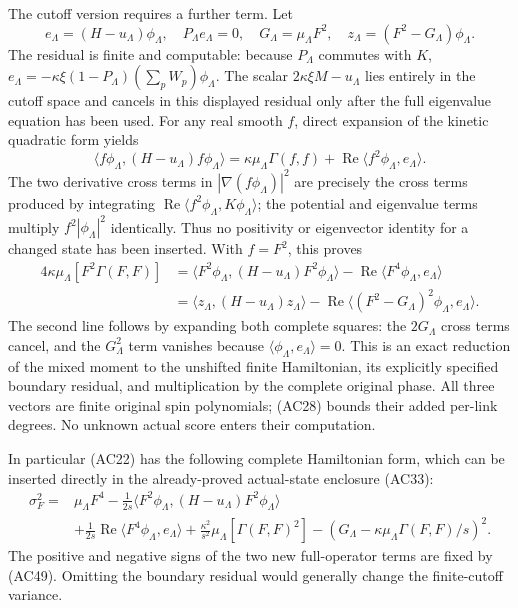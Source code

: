 \documentclass[11pt]{article}
\begin{document}
The cutoff version requires a further term. Let
\[
 e_\Lambda=(H-u_\Lambda)\phi_\Lambda,\quad
 P_\Lambda e_\Lambda=0,\quad
 G_\Lambda=\mu_\Lambda F^2,\quad
 z_\Lambda=(F^2-G_\Lambda)\phi_\Lambda .
 \tag{AC48}
\]
The residual is finite and computable: because \(P_\Lambda\) commutes with \(K\),
\(e_\Lambda=-\kappa\xi(1-P_\Lambda)(\sum_pW_p)\phi_\Lambda\).
The scalar \(2\kappa\xi M-u_\Lambda\) lies entirely in the cutoff space and cancels in this displayed residual only after the full eigenvalue equation has been used. For any real smooth \(f\), direct expansion of the kinetic quadratic form yields
\[
 \langle f\phi_\Lambda,(H-u_\Lambda)f\phi_\Lambda\rangle
 =\kappa\mu_\Lambda\Gamma(f,f)
       +\operatorname{Re}\langle f^2\phi_\Lambda,e_\Lambda\rangle .
\]
The two derivative cross terms in \(|\nabla(f\phi_\Lambda)|^2\) are precisely the cross terms produced by integrating
\(\operatorname{Re}\langle f^2\phi_\Lambda,K\phi_\Lambda\rangle\);
the potential and eigenvalue terms multiply \(f^2|\phi_\Lambda|^2\) identically. Thus no positivity or eigenvector identity for a changed state has been inserted. With \(f=F^2\), this proves
\[
 \begin{aligned}
 4\kappa\mu_\Lambda[F^2\Gamma(F,F)]
 &=\langle F^2\phi_\Lambda,(H-u_\Lambda)F^2\phi_\Lambda\rangle
       -\operatorname{Re}\langle F^4\phi_\Lambda,e_\Lambda\rangle\\
 &=\langle z_\Lambda,(H-u_\Lambda)z_\Lambda\rangle
       -\operatorname{Re}
          \langle(F^2-G_\Lambda)^2\phi_\Lambda,e_\Lambda\rangle .
 \end{aligned}\tag{AC49}
\]
The second line follows by expanding both complete squares: the \(2G_\Lambda\) cross terms cancel, and the \(G_\Lambda^2\) term vanishes because \(\langle\phi_\Lambda,e_\Lambda\rangle=0\). This is an exact reduction of the mixed moment to the unshifted finite Hamiltonian, its explicitly specified boundary residual, and multiplication by the complete original phase. All three vectors are finite original spin polynomials; (AC28) bounds their added per-link degrees. No unknown actual score enters their computation.

In particular (AC22) has the following complete Hamiltonian form, which can be inserted directly in the already-proved actual-state enclosure (AC33):
\[
 \begin{aligned}
 \sigma_F^2={}&\mu_\Lambda F^4
 -\frac1{2s}
     \langle F^2\phi_\Lambda,(H-u_\Lambda)F^2\phi_\Lambda\rangle\\
 &+\frac1{2s}\operatorname{Re}
                  \langle F^4\phi_\Lambda,e_\Lambda\rangle
 +\frac{\kappa^2}{s^2}\mu_\Lambda[\Gamma(F,F)^2]
 -(G_\Lambda-\kappa\mu_\Lambda\Gamma(F,F)/s)^2 .
 \end{aligned}\tag{AC50}
\]
The positive and negative signs of the two new full-operator terms are fixed by (AC49). Omitting the boundary residual would generally change the finite-cutoff variance.
\end{document}
